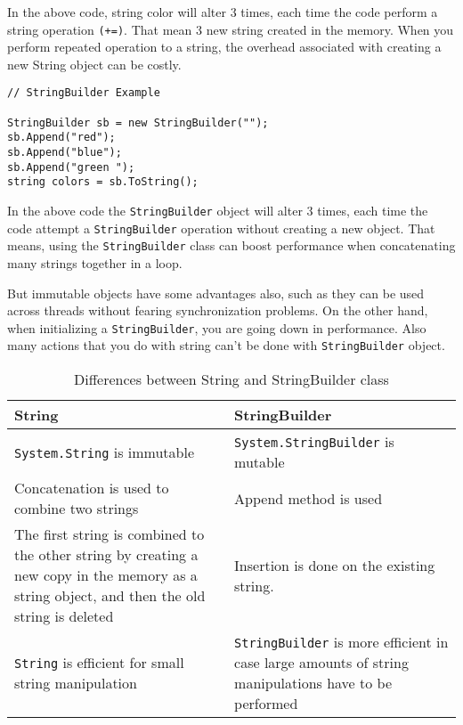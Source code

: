 In the above code, string color will alter 3 times, each time the code perform a string operation \verb|(+=)|. That mean 3 new string created in the memory. When you perform repeated operation to a string, the overhead associated with creating a new String object can be costly.

\begin{lstlisting}
// StringBuilder Example

StringBuilder sb = new StringBuilder("");
sb.Append("red");
sb.Append("blue");
sb.Append("green ");
string colors = sb.ToString();
\end{lstlisting}

In the above code the \texttt{StringBuilder} object will alter 3 times, each time the code attempt a \texttt{StringBuilder} operation without creating a new object. That means, using the \texttt{StringBuilder} class can boost performance when concatenating many strings together in a loop.

But immutable objects have some advantages also, such as they can be used across threads without fearing synchronization problems. On the other hand, when initializing a \texttt{StringBuilder}, you are going down in performance. Also many actions that you do with string can't be done with \texttt{StringBuilder} object.

	\begin{table}[ht]
	\centering
	\caption{Differences between String and StringBuilder class}\label{tab:string-vs-string-builder}
	\begin{tabular}{p{5.5cm}p{5.5cm}}
	\toprule %
		\textbf{String} & \textbf{StringBuilder} \\
		\midrule %
		\texttt{System.String} is immutable  &
		\texttt{System.StringBuilder} is mutable \\
	
Concatenation is used to combine two strings & Append method is used\\

 The first string is combined to the other string by creating a new copy in the memory as a string object, and then the old string is deleted
  & Insertion is done on the existing string. \\

  \texttt{String} is efficient for small string manipulation & \texttt{StringBuilder} is more efficient in case large amounts of string manipulations have to be performed \\
	  \bottomrule %
	\end{tabular}
	\end{table}


